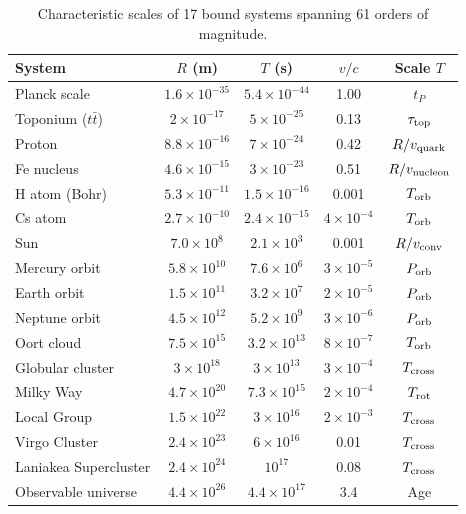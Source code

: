\documentclass[10pt,a4paper]{article}
\begin{document}
\begin{table}[h]
\centering
\caption{Characteristic scales of 17 bound systems spanning 61 orders of magnitude.}\label{tab:TR}
\begin{tabular}{lcccc}
\toprule
System & $R$ (m) & $T$ (s) & $v/c$ & Scale $T$ \\
\midrule
Planck scale & $1.6\times10^{-35}$ & $5.4\times10^{-44}$ & 1.00 & $t_P$ \\
Toponium ($t\bar{t}$) & $2\times10^{-17}$ & $5\times10^{-25}$ & 0.13 & $\tau_{\rm top}$ \\
Proton & $8.8\times10^{-16}$ & $7\times10^{-24}$ & 0.42 & $R/v_{\rm quark}$ \\
Fe nucleus & $4.6\times10^{-15}$ & $3\times10^{-23}$ & 0.51 & $R/v_{\rm nucleon}$ \\
H atom (Bohr) & $5.3\times10^{-11}$ & $1.5\times10^{-16}$ & 0.001 & $T_{\rm orb}$ \\
Cs atom & $2.7\times10^{-10}$ & $2.4\times10^{-15}$ & $4\times10^{-4}$ & $T_{\rm orb}$ \\
\midrule
Sun & $7.0\times10^{8}$ & $2.1\times10^{3}$ & 0.001 & $R/v_{\rm conv}$ \\
Mercury orbit & $5.8\times10^{10}$ & $7.6\times10^{6}$ & $3\times10^{-5}$ & $P_{\rm orb}$ \\
Earth orbit & $1.5\times10^{11}$ & $3.2\times10^{7}$ & $2\times10^{-5}$ & $P_{\rm orb}$ \\
Neptune orbit & $4.5\times10^{12}$ & $5.2\times10^{9}$ & $3\times10^{-6}$ & $P_{\rm orb}$ \\
\midrule
Oort cloud & $7.5\times10^{15}$ & $3.2\times10^{13}$ & $8\times10^{-7}$ & $T_{\rm orb}$ \\
Globular cluster & $3\times10^{18}$ & $3\times10^{13}$ & $3\times10^{-4}$ & $T_{\rm cross}$ \\
Milky Way & $4.7\times10^{20}$ & $7.3\times10^{15}$ & $2\times10^{-4}$ & $T_{\rm rot}$ \\
Local Group & $1.5\times10^{22}$ & $3\times10^{16}$ & $2\times10^{-3}$ & $T_{\rm cross}$ \\
Virgo Cluster & $2.4\times10^{23}$ & $6\times10^{16}$ & 0.01 & $T_{\rm cross}$ \\
Laniakea Supercluster & $2.4\times10^{24}$ & $10^{17}$ & 0.08 & $T_{\rm cross}$ \\
Observable universe & $4.4\times10^{26}$ & $4.4\times10^{17}$ & 3.4 & Age \\
\bottomrule
\end{tabular}
\end{table}
\end{document}
